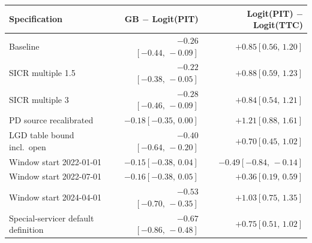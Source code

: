 \begin{tabular}{lrr}
\toprule
Specification & GB $-$ Logit(PIT) & Logit(PIT) $-$ Logit(TTC) \\
\midrule
Baseline & $-0.26$\;$[-0.44,\,-0.09]$ & $+0.85$\;$[0.56,\,1.20]$ \\
SICR multiple 1.5 & $-0.22$\;$[-0.38,\,-0.05]$ & $+0.88$\;$[0.59,\,1.23]$ \\
SICR multiple 3 & $-0.28$\;$[-0.46,\,-0.09]$ & $+0.84$\;$[0.54,\,1.21]$ \\
PD source recalibrated & $-0.18$\;$[-0.35,\,0.00]$ & $+1.21$\;$[0.88,\,1.61]$ \\
LGD table bound incl.\ open & $-0.40$\;$[-0.64,\,-0.20]$ & $+0.70$\;$[0.45,\,1.02]$ \\
Window start 2022-01-01 & $-0.15$\;$[-0.38,\,0.04]$ & $-0.49$\;$[-0.84,\,-0.14]$ \\
Window start 2022-07-01 & $-0.16$\;$[-0.38,\,0.05]$ & $+0.36$\;$[0.19,\,0.59]$ \\
Window start 2024-04-01 & $-0.53$\;$[-0.70,\,-0.35]$ & $+1.03$\;$[0.75,\,1.35]$ \\
Special-servicer default definition & $-0.67$\;$[-0.86,\,-0.48]$ & $+0.75$\;$[0.51,\,1.02]$ \\
\bottomrule
\end{tabular}
